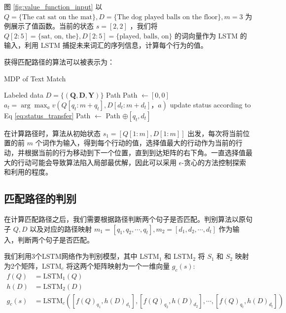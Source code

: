 图 \ref{fig:value_function_input} 以 $Q=\{\text{The cat sat on the mat}\},D=\{\text{The dog played balls on the floor}\}, m=3$ 为例展示了值函数。当前的状态 $s=[2, 2]$ ，我们将 $Q[2:5]=\{\text{sat, on, the}\}, D[2:5]=\{\text{played, balls, on}\}$ 的词向量作为 LSTM 的输入，利用 LSTM 捕捉未来词汇的序列信息，计算每个行为的值。

获得匹配路径的算法可以被表示为：
\begin{algorithm}[!htbp]
    \small
    \caption{MDP of Text Match}\label{alg:MDP_TM}
    \renewcommand{\algorithmicrequire}{\textbf{Input:}}
    \renewcommand{\algorithmicensure}{\textbf{Output:}}
    \begin{algorithmic}
        \Require Labeled data $D=\{ (\mathbf{Q}, \mathbf{D}, \mathbf{Y}) \}$
        \Ensure Path
        \State {} Path $\leftarrow [0, 0]$
        \State $a_t = \arg\max_a v(Q [q_t:m+q_t], D [d_t:m+d_t]， a)$
        \State update status according to Eq \ref{eq:status_transfer}
        \State Path $\leftarrow$ Path $\oplus [q_t, d_t]$ 
        \EndWhile
    \end{algorithmic}
\end{algorithm}

在计算路径时，算法从初始状态 $s_1 = [Q[1:m], D[1:m]]$ 出发，每次将当前位置的前 $m$ 个词作为输入，得到每个行动的值，选择值最大的行动作为当前的行动，并根据当前的行为移动到下一个位置，直到到达矩阵的右下角。一直选择值最大的行动可能会导致算法陷入局部最优解，因此可以采用 $\epsilon$-贪心的方法控制探索和利用的程度。

\subsection{匹配路径的判别}
\label{sec:path_classify}

在计算匹配路径之后，我们需要根据路径判断两个句子是否匹配。判别算法以原句子 $Q, D$ 以及对应的路径映射 $m_1 = [q_1, q_2, \cdots, q_t], m_2 = [d_1, d_2, \cdots, d_t]$ 作为输入，判断两个句子是否匹配。

我们利用3个LSTM网络作为判别模型，其中 LSTM$_1$ 和 LSTM$_2$ 将 $S_1$ 和 $S_2$ 映射为2个矩阵，LSTM$_c$ 将这两个矩阵映射为一个一维向量 $g_c(s)$:
$$
\begin{aligned}
f(Q) &= \text{LSTM}_1(Q) \\
h(D) &= \text{LSTM}_2(D) \\
g_c(s) &= \text{LSTM}_c([{f(Q)}_{q_1}, {h(D)}_{d_1}], [{f(Q)}_{q_2}, {h(D)}_{d_2}], \cdots, [{f(Q)}_{q_t}, {h(D)}_{d_t}])
\end{aligned}
$$

